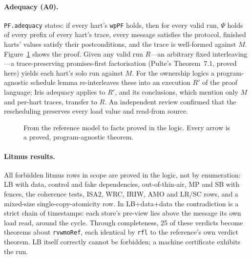 \documentclass[sigplan,screen,nonacm]{acmart}
\newcommand{\vtwo}{machine~v2\xspace}
\newcommand{\code}[1]{\texttt{#1}}
\begin{document}
\paragraph{Adequacy (A0).}
\code{PF.adequacy} states: if every hart's \code{wpPF} holds, then for every valid run, $\Psi$ holds of every prefix of
every hart's trace, every message satisfies the protocol, finished harts' values satisfy their postconditions, and the
trace is well-formed against $M$. Figure~\ref{fig:chain} shows the proof. Given any valid run $R$---an arbitrary fixed
interleaving---a trace-preserving promises-first factorisation (Pulte's Theorem~7.1, proved here) yields each hart's
solo run against $M$. For the ownership logics a program-agnostic schedule lemma re-interleaves these into an
execution $R'$ of the proof language; Iris adequacy applies to $R'$, and its conclusions, which mention only $M$ and
per-hart traces, transfer to $R$. An independent review confirmed that the rescheduling preserves every load value
and read-from source.

\begin{figure}[t]
\centering
{}
\caption{From the reference model to facts proved in the logic. Every arrow is a proved, program-agnostic theorem.}
\label{fig:chain}
\end{figure}

\paragraph{Litmus results.}
All forbidden litmus rows in scope are proved in the logic, not by enumeration: LB with data, control and fake
dependencies, out-of-thin-air, MP and SB with fences, the coherence tests, ISA2, WRC, IRIW, AMO and LR/SC rows, and a
mixed-size single-copy-atomicity row. In LB+data+data the contradiction is a strict chain of timestamps: each store's
pre-view lies above the message its own load read, around the cycle. Through completeness, 25 of these verdicts
become theorems about \code{rvwmoRef}, each identical by \code{rfl} to the reference's own verdict theorem. LB itself
correctly cannot be forbidden; a machine certificate exhibits the run.
\end{document}
